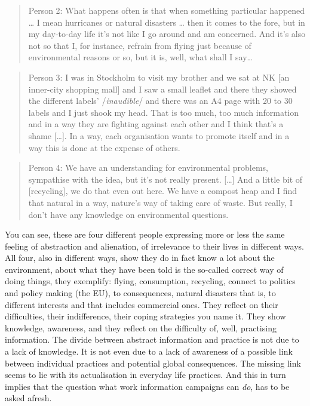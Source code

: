 ﻿\documentclass[a4paper,
fontsize=11pt,
oneside,
numbers=noperiodatend,
parskip=half-,
bibliography=totoc,
final
]{scrartcl}
\begin{document}
\begin{quote}
Person 2: What happens often is that when something particular happened
\ldots{} I mean hurricanes or natural disasters \ldots{} then it comes
to the fore, but in my day-to-day life it's not like I go around and am
concerned. And it's also not so that I, for instance, refrain from
flying just because of environmental reasons or so, but it is, well,
what shall I say\ldots{}
\end{quote}

\begin{quote}
Person 3: I was in Stockholm to visit my brother and we sat at NK {[}an
inner-city shopping mall{]} and I saw a small leaflet and there they
showed the different labels' /\emph{inaudible}/ and there was an A4 page
with 20 to 30 labels and I just shook my head. That is too much, too
much information and in a way they are fighting against each other and I
think that's a shame {[}\ldots{}{]}. In a way, each organisation wants
to promote itself and in a way this is done at the expense of others.~
\end{quote}

\begin{quote}
Person 4: We have an understanding for environmental problems,
sympathise with the idea, but it's not really present. {[}\ldots{}{]}
And a little bit of {[}recycling{]}, we do that even out here. We have a
compost heap and I find that natural in a way, nature's way of taking
care of waste. But really, I don't have any knowledge on environmental
questions.
\end{quote}

You can see, these are four different people expressing more or less the
same feeling of abstraction and alienation, of irrelevance to their
lives in different ways. All four, also in different ways, show they do
in fact know a lot about the environment, about what they have been told
is the so-called correct way of doing things, they exemplify: flying,
consumption, recycling, connect to politics and policy making (the EU),
to consequences, natural disasters that is, to different interests and
that includes commercial ones. They reflect on their difficulties, their
indifference, their coping strategies you name it. They show knowledge,
awareness, and they reflect on the difficulty of, well, practising
information. The divide between abstract information and practice is not
due to a lack of knowledge. It is not even due to a lack of awareness of
a possible link between individual practices and potential global
consequences. The missing link seems to lie with its actualisation in
everyday life practices. And this in turn implies that the question what
work information campaigns can \emph{do}, has to be asked afresh.
\end{document}
